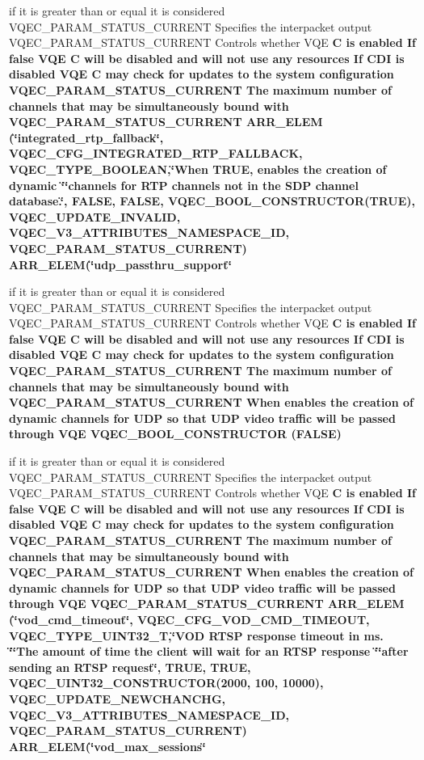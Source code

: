\begin{CompactItemize}
if it is greater than or equal it is considered VQEC\_\-PARAM\_\-STATUS\_\-CURRENT Specifies the interpacket output VQEC\_\-PARAM\_\-STATUS\_\-CURRENT Controls whether VQE \bf{C} is enabled If false VQE \bf{C} will be disabled and will not use any resources If CDI is disabled VQE \bf{C} may check for updates \bf{to} the system configuration VQEC\_\-PARAM\_\-STATUS\_\-CURRENT The maximum number of \bf{channels} that may be simultaneously bound with VQEC\_\-PARAM\_\-STATUS\_\-CURRENT \bf{ARR\_\-ELEM} (\char`\"{}integrated\_\-rtp\_\-fallback\char`\"{}, VQEC\_\-CFG\_\-INTEGRATED\_\-RTP\_\-FALLBACK, \bf{VQEC\_\-TYPE\_\-BOOLEAN},\char`\"{}When \bf{TRUE}, enables the creation of dynamic \char`\"{}\char`\"{}\bf{channels} for RTP \bf{channels} not in the SDP channel database.\char`\"{}, FALSE, \bf{FALSE}, VQEC\_\-BOOL\_\-CONSTRUCTOR(\bf{TRUE}), \bf{VQEC\_\-UPDATE\_\-INVALID}, \bf{VQEC\_\-V3\_\-ATTRIBUTES\_\-NAMESPACE\_\-ID}, VQEC\_\-PARAM\_\-STATUS\_\-CURRENT) ARR\_\-ELEM(\char`\"{}udp\_\-passthru\_\-support\char`\"{}
\item 
if it is greater than or equal it is considered VQEC\_\-PARAM\_\-STATUS\_\-CURRENT Specifies the interpacket output VQEC\_\-PARAM\_\-STATUS\_\-CURRENT Controls whether VQE \bf{C} is enabled If false VQE \bf{C} will be disabled and will not use any resources If CDI is disabled VQE \bf{C} may check for updates \bf{to} the system configuration VQEC\_\-PARAM\_\-STATUS\_\-CURRENT The maximum number of \bf{channels} that may be simultaneously bound with VQEC\_\-PARAM\_\-STATUS\_\-CURRENT When enables the creation of dynamic \bf{channels} for UDP so that UDP video traffic will be passed through VQE \bf{VQEC\_\-BOOL\_\-CONSTRUCTOR} (\bf{FALSE})
\item 
if it is greater than or equal it is considered VQEC\_\-PARAM\_\-STATUS\_\-CURRENT Specifies the interpacket output VQEC\_\-PARAM\_\-STATUS\_\-CURRENT Controls whether VQE \bf{C} is enabled If false VQE \bf{C} will be disabled and will not use any resources If CDI is disabled VQE \bf{C} may check for updates \bf{to} the system configuration VQEC\_\-PARAM\_\-STATUS\_\-CURRENT The maximum number of \bf{channels} that may be simultaneously bound with VQEC\_\-PARAM\_\-STATUS\_\-CURRENT When enables the creation of dynamic \bf{channels} for UDP so that UDP video traffic will be passed through VQE VQEC\_\-PARAM\_\-STATUS\_\-CURRENT \bf{ARR\_\-ELEM} (\char`\"{}vod\_\-cmd\_\-timeout\char`\"{}, VQEC\_\-CFG\_\-VOD\_\-CMD\_\-TIMEOUT, \bf{VQEC\_\-TYPE\_\-UINT32\_\-T},\char`\"{}VOD RTSP response timeout in ms. \char`\"{}\char`\"{}The amount of time the client will wait for an RTSP response \char`\"{}\char`\"{}after sending an RTSP request\char`\"{}, TRUE, \bf{TRUE}, VQEC\_\-UINT32\_\-CONSTRUCTOR(2000, 100, 10000), \bf{VQEC\_\-UPDATE\_\-NEWCHANCHG}, \bf{VQEC\_\-V3\_\-ATTRIBUTES\_\-NAMESPACE\_\-ID}, VQEC\_\-PARAM\_\-STATUS\_\-CURRENT) ARR\_\-ELEM(\char`\"{}vod\_\-max\_\-sessions\char`\"{}

\end{CompactItemize}
